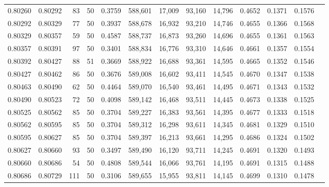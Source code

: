 \begin{tabular}{rrrrrrrrrrrrr}
0.80260 & 0.80292 &    83 &  50 &                                     0.3759 & 588,601 &  17,009 &  93,160 &  14,796 & 0.4652 & 0.1371 & 0.1576 \\
0.80292 & 0.80329 &    77 &  50 &                                     0.3937 & 588,678 &  16,932 &  93,210 &  14,746 & 0.4655 & 0.1366 & 0.1568 \\
0.80329 & 0.80357 &    59 &  50 &                                     0.4587 & 588,737 &  16,873 &  93,260 &  14,696 & 0.4655 & 0.1361 & 0.1563 \\
0.80357 & 0.80391 &    97 &  50 &                                     0.3401 & 588,834 &  16,776 &  93,310 &  14,646 & 0.4661 & 0.1357 & 0.1554 \\
0.80392 & 0.80427 &    88 &  51 &                                     0.3669 & 588,922 &  16,688 &  93,361 &  14,595 & 0.4665 & 0.1352 & 0.1546 \\
0.80427 & 0.80462 &    86 &  50 &                                     0.3676 & 589,008 &  16,602 &  93,411 &  14,545 & 0.4670 & 0.1347 & 0.1538 \\
0.80463 & 0.80490 &    62 &  50 &                                     0.4464 & 589,070 &  16,540 &  93,461 &  14,495 & 0.4671 & 0.1343 & 0.1532 \\
0.80490 & 0.80523 &    72 &  50 &                                     0.4098 & 589,142 &  16,468 &  93,511 &  14,445 & 0.4673 & 0.1338 & 0.1525 \\
0.80525 & 0.80562 &    85 &  50 &                                     0.3704 & 589,227 &  16,383 &  93,561 &  14,395 & 0.4677 & 0.1333 & 0.1518 \\
0.80562 & 0.80595 &    85 &  50 &                                     0.3704 & 589,312 &  16,298 &  93,611 &  14,345 & 0.4681 & 0.1329 & 0.1510 \\
0.80595 & 0.80627 &    85 &  50 &                                     0.3704 & 589,397 &  16,213 &  93,661 &  14,295 & 0.4686 & 0.1324 & 0.1502 \\
0.80627 & 0.80660 &    93 &  50 &                                     0.3497 & 589,490 &  16,120 &  93,711 &  14,245 & 0.4691 & 0.1320 & 0.1493 \\
0.80660 & 0.80686 &    54 &  50 &                                     0.4808 & 589,544 &  16,066 &  93,761 &  14,195 & 0.4691 & 0.1315 & 0.1488 \\
0.80686 & 0.80729 &   111 &  50 &                                     0.3106 & 589,655 &  15,955 &  93,811 &  14,145 & 0.4699 & 0.1310 & 0.1478 \\

\end{tabular}
